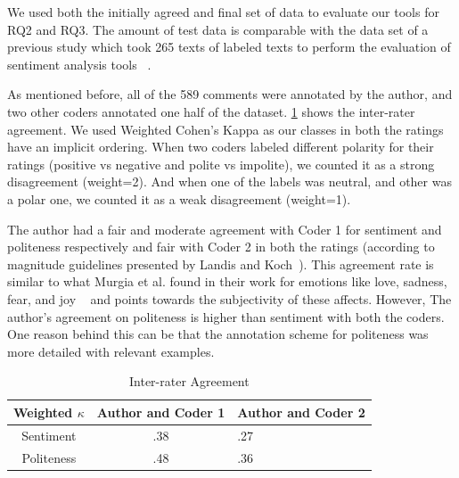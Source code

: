 We used both the initially agreed and final set of data to evaluate our tools for RQ2 and RQ3. The amount of test data is comparable with the data set of a previous study which took 265 texts of labeled texts to perform the evaluation of sentiment analysis tools ~\cite{jongeling2017negative}.

As mentioned before, all of the 589 comments were annotated by the author, and two other coders annotated one half of the dataset. \ref{interrater} shows the inter-rater agreement. We used Weighted Cohen's Kappa as our classes in both the ratings have an implicit ordering. When two coders labeled different polarity for their ratings (positive vs negative and polite vs impolite), we counted it as a strong disagreement (weight=2). And when one of the labels was neutral, and other was a polar one, we counted it as a weak disagreement (weight=1).

The author had a fair and moderate agreement with Coder 1 for sentiment and politeness respectively and fair with Coder 2 in both the ratings (according to magnitude guidelines presented by Landis and Koch~\cite{landis1977measurement}). This agreement rate is similar to what Murgia et al. found in their work for emotions like love, sadness, fear, and joy ~\citet{murgia2014developers} and points towards the subjectivity of these affects. However, The author's agreement on politeness is higher than sentiment with both the coders. One reason behind this can be that the annotation scheme for politeness was more detailed with relevant examples. 

\vspace{3mm}
\noindent{}


\begin{table}
\centering
\caption{Inter-rater Agreement}
  \label{interrater}
  \begin{tabular}{|c|c|l|}
    \toprule
    Weighted $\kappa$ & Author and Coder 1 &  Author and  Coder 2\\
    \midrule
    Sentiment & .38 & .27 \\
    \hline
    Politeness & .48 & .36\\
  \bottomrule
\end{tabular}
\end{table}

